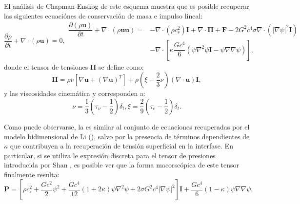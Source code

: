El an\'alisis de Chapman-Enskog de este esquema muestra que es posible recuperar las siguientes ecuaci\'ones de conservaci\'on de masa e impulso lineal:
\begin{subequations}
	\begin{equation}
		\dfrac{\partial \rho}{\partial t} + \nabla \cdot (\rho \bm{u}) = 0,
	\end{equation}
	\begin{equation}
		\begin{aligned}
		\dfrac{\partial(\rho\bm{u})}{\partial t} + \nabla \cdot (\rho \bm{u} \bm{u})  = &-\nabla \cdot(\rho c_s^2)\bm{I} + \nabla \cdot \bm{\Pi} + \bm{F} - 2G^2 c^4 \sigma \nabla \cdot (|\nabla \psi|^2 \bm{I}) \\
		& -\nabla \cdot \left[ \kappa \dfrac{Gc^4}{6} (\psi \nabla^2 \psi \bm{I} - \psi \nabla \nabla \psi) \right],
		\end{aligned}
	\end{equation}
	\label{eq:xu_macro}
\end{subequations}
donde el tensor de tensiones $\bm{\Pi}$ se define como:
\begin{equation}
	\bm{\Pi} = \rho \nu \left[ \nabla \bm{u} + (\nabla \bm{u})^T \right] + \rho \left( \xi - \dfrac{2}{3}\nu \right) (\nabla \cdot \bm{u})\bm{I},
\end{equation}
y las viscosidades cinem\'atica y  corresponden a:
\begin{subequations}
	\begin{equation}
		\nu = \dfrac{1}{3} \left( \tau_{\nu} - \dfrac{1}{2}\right) \delta_t,
	\end{equation}
	\begin{equation}
		\xi = \dfrac{2}{9} \left( \tau_{e} - \dfrac{1}{2}\right) \delta_t.
	\end{equation}	
\end{subequations}

Como puede observarse, la  es similar al conjunto de ecuaciones recuperadas por el modelo bidimensional de Li (), salvo por la presencia de t\'erminos dependientes de $\kappa$ que contribuyen a la recuperaci\'on de tensi\'on superficial en la interfase. En particular, si se utiliza le expresi\'on discreta para el tensor de presiones introducida por Shan \cite{shan_pressure_2008}, es posible ver que la forma macorsc\'opica de este tensor finalmente resulta:
\begin{equation}
	\bm{P} = \left[ \rho c_s^2 + \dfrac{G c^2}{2} \psi^2 + \dfrac{G c^4}{12} (1+2\kappa) \psi \nabla^2 \psi + 2 \sigma G^2 c^4 |\nabla \psi|^2\right] \bm{I} + \dfrac{G c^4}{6} (1-\kappa) \psi \nabla \nabla \psi.
	\label{eq:PTens_Xu}
\end{equation}


